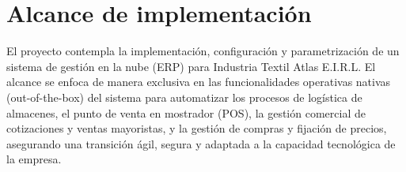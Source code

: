 \section{Alcance de implementación}
\begin{indentedsubsection}
El proyecto contempla la implementación, configuración y parametrización de un sistema de gestión en la nube (ERP) para Industria Textil Atlas E.I.R.L. El alcance se enfoca de manera exclusiva en las funcionalidades operativas nativas (out-of-the-box) del sistema para automatizar los procesos de logística de almacenes, el punto de venta en mostrador (POS), la gestión comercial de cotizaciones y ventas mayoristas, y la gestión de compras y fijación de precios, asegurando una transición ágil, segura y adaptada a la capacidad tecnológica de la empresa.
\end{indentedsubsection}

